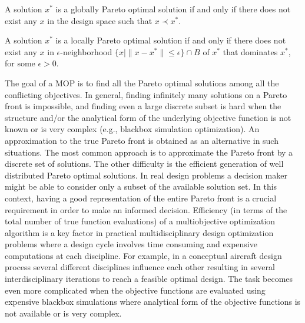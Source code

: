 A solution $x^*$ is a globally Pareto optimal solution if and only if there 
does not exist any $x$ in the design space such that $x\prec x^*$. 

A solution $x^*$ is a locally Pareto optimal solution if and only if there 
does not exist any $x$ in $\epsilon$-neighborhood $\bigl\{ x \mid\|x-x^*\| 
\le\epsilon \bigr\}\cap B$ of $x^*$ that dominates $x^*$, for some $\epsilon > 0$.  

The goal of a MOP is to find all the Pareto optimal solutions among all the
conflicting objectives. In general, finding infinitely many solutions on a
Pareto front is impossible, and finding even a large discrete subset is hard
when the structure and/or the analytical form of the underlying objective
function is not known or is very complex (e.g., blackbox simulation
optimization). An approximation to the true Pareto front is obtained as an
alternative in such situations. The most common approach is to approximate the
Pareto front by a discrete set of solutions. The other difficulty is the
efficient generation of well distributed Pareto optimal solutions. In real
design problems a decision maker might be able to consider only a subset of the
available solution set. In this context, having a good representation of the
entire Pareto front is a crucial requirement in order to make an informed
decision. Efficiency (in terms of the total number of true function
evaluations) of a multiobjective optimization algorithm is a key factor in
practical multidisciplinary design optimization problems where a design cycle
involves time consuming and expensive computations at each discipline. For
example, in a conceptual aircraft design process several different disciplines
influence each other resulting in several interdisciplinary iterations 
to reach a feasible optimal design. The task becomes even more complicated 
when the objective functions are evaluated using expensive blackbox 
simulations where analytical form of the objective functions is not 
available or is very complex.  


